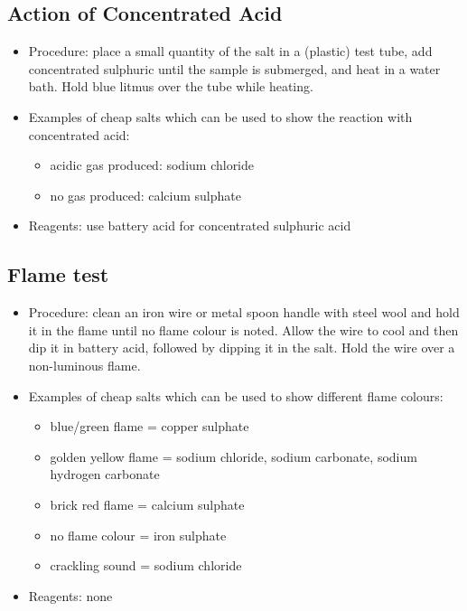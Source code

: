 \subsection{Action of Concentrated Acid}
\begin{itemize}
\item{Procedure: place a small quantity of the salt in a (plastic) test tube, 
add concentrated sulphuric until the sample is submerged, 
and heat in a water bath. 
Hold blue litmus over the tube while heating.}
\item{Examples of cheap salts which can be used to show the reaction with concentrated acid:}
\begin{itemize}
\item{acidic gas produced: sodium chloride}
\item{no gas produced: calcium sulphate}
\end{itemize}
\item{Reagents: use battery acid for concentrated sulphuric acid}
\end{itemize}

\subsection{Flame test}
\begin{itemize}
\item{Procedure: clean an iron wire or metal spoon handle 
with steel wool and hold it in the flame until no flame colour is noted. Allow the wire to cool and then dip it in battery acid, followed by dipping it in the salt. Hold the wire over a non-luminous flame.}
\item{Examples of cheap salts which can be used to show different flame colours:}
\begin{itemize}
\item{blue/green flame = copper sulphate}
\item{golden yellow flame = sodium chloride, 
sodium carbonate, 
sodium hydrogen carbonate}
\item{brick red flame = calcium sulphate}
\item{no flame colour = iron sulphate}
\item{crackling sound = sodium chloride}
\end{itemize}
\item{Reagents: none}
\end{itemize}

